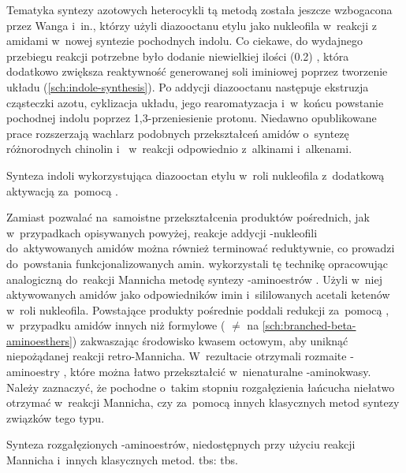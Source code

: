 Tematyka syntezy azotowych heterocykli tą metodą została jeszcze wzbogacona przez Wanga i~in.,
  którzy użyli diazooctanu etylu  jako nukleofila w~reakcji z~
    amidami  w~nowej syntezie pochodnych indolu.
Co ciekawe, do wydajnego przebiegu reakcji potrzebne było dodanie niewielkiej ilości (\SI{0.2}{\equiv}) ,
  która dodatkowo zwiększa reaktywność generowanej soli iminiowej poprzez tworzenie układu  (\cref{sch:indole-synthesis}).
Po addycji diazooctanu następuje ekstruzja cząsteczki azotu, cyklizacja układu, jego rearomatyzacja
  i~w~końcu powstanie pochodnej indolu  poprzez 1,3-przeniesienie protonu.
Niedawno opublikowane prace rozszerzają wachlarz podobnych przekształceń  amidów o~syntezę różnorodnych
  chinolin i~ w~reakcji odpowiednio z~alkinami i~alkenami.
\begin{scheme*}
  
  \caption{Synteza indoli wykorzystująca diazooctan etylu w~roli nukleofila z~dodatkową aktywacją za~pomocą .}
  \label{sch:indole-synthesis}
\end{scheme*}

Zamiast pozwalać na~samoistne przekształcenia produktów pośrednich, jak w~przypadkach opisywanych powyżej,
  reakcje addycji \textpi-nukleofili do~aktywowanych amidów można również terminować reduktywnie, co prowadzi do~powstania funkcjonalizowanych amin.
\citeauthor{belanger15} wykorzystali tę technikę opracowując analogiczną do~reakcji Mannicha
  metodę syntezy \textbeta-aminoestrów .
Użyli w~niej aktywowanych amidów jako odpowiedników imin i~sililowanych acetali ketenów w~roli nukleofila.
Powstające produkty pośrednie  poddali redukcji za~pomocą ,
  w~przypadku amidów innych niż formylowe ( $\neq$  na \cref{sch:branched-beta-aminoesthers})
  zakwaszając środowisko kwasem octowym, aby uniknąć niepożądanej reakcji retro-Mannicha.
W~rezultacie otrzymali rozmaite \textbeta-aminoestry ,
  które można łatwo przekształcić w~nienaturalne \textbeta-aminokwasy.
Należy zaznaczyć, że pochodne o~takim stopniu rozgałęzienia łańcucha niełatwo otrzymać w~reakcji Mannicha,
  czy za~pomocą innych klasycznych metod syntezy związków tego typu.
\begin{scheme*}
  \centering
  
  \caption{
    Synteza rozgałęzionych \textbeta-aminoestrów, niedostępnych przy użyciu reakcji Mannicha i~innych klasycznych metod.
    \acrshort{tbs}: \acrlong{tbs}.
  }
  \label{sch:branched-beta-aminoesthers}
\end{scheme*}

